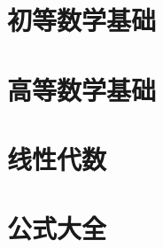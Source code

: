 \documentclass[a4paper,12pt]{article}
\begin{document}

\section{初等数学基础}



\section{高等数学基础}



\section{线性代数}


\section{公式大全}






\end{document}
